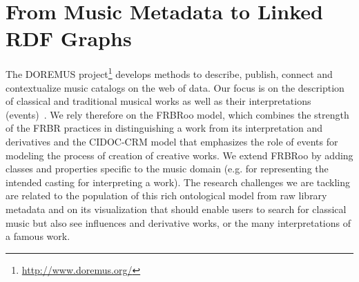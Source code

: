 \documentclass[runningheads,a4paper]{llncs}
\begin{document}
\section{From Music Metadata to Linked RDF Graphs}
\label{sec:conversion}
The DOREMUS project\footnote{\url{http://www.doremus.org/}} develops methods to describe, publish, connect and contextualize music catalogs on the web of data. Our focus is on the description of classical and traditional musical works as well as their interpretations (events)~\cite{achichi2015doremus}. We rely therefore on the FRBRoo model, which combines the strength of the FRBR practices in distinguishing a work from its interpretation and derivatives and the CIDOC-CRM model that emphasizes the role of events for modeling the process of creation of creative works. We extend FRBRoo by adding classes and properties specific to the music domain (e.g. for representing the intended casting for interpreting a work). The research challenges we are tackling are related to the population of this rich ontological model from raw library metadata and on its visualization that should enable users to search for classical music but also see influences and derivative works, or the many interpretations of a famous work.
\end{document}

